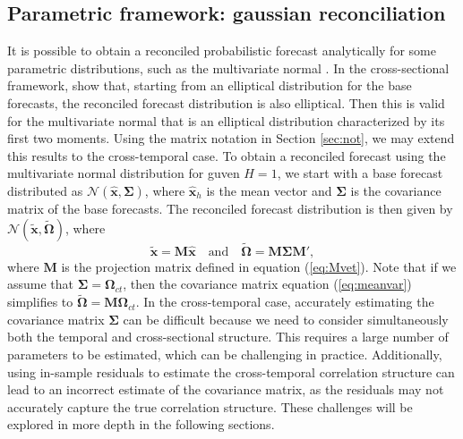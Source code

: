 \documentclass[a4paper,11pt]{article}
\newcommand{\xvet}{\bm{x}}
\newcommand{\Mvet}{\bm{M}}
\newcommand{\Omegavet}{\bm{\Omega}}
\newcommand{\Sigmavet}{\bm{\Sigma}}
\theoremstyle{definition}
\begin{document}
\subsection{Parametric framework: gaussian reconciliation}\label{ssec:prob_pf}
It is possible to obtain a reconciled probabilistic forecast analytically for some parametric distributions, such as the multivariate normal \citep{panagiotelis2023, wickramasuriya2021b, corani2021, eckert2021}. In the cross-sectional framework, \cite{panagiotelis2023} show that, starting from an elliptical distribution for the base forecasts, the reconciled forecast distribution is also elliptical. Then this is valid for the multivariate normal that is an elliptical distribution characterized by its first two moments. Using the matrix notation in Section \ref{sec:not}, we may extend this results to the cross-temporal case. 
To obtain a reconciled forecast using the multivariate normal distribution for guven  $H = 1$, we start with a base forecast distributed as $\mathcal{N}(\widehat{\xvet}, \Sigmavet)$, where $\widehat{\xvet}_h$ is the mean vector and $\Sigmavet$ is the covariance matrix of the base forecasts. The reconciled forecast distribution is then given by $\mathcal{N}(\widetilde{\xvet}, \widetilde{\Omegavet})$, where
\begin{equation}\label{eq:meanvar}
	\widetilde{\xvet} = \Mvet\widehat{\xvet} \quad \mbox{and} \quad \widetilde{\Omegavet} = \Mvet \Sigmavet \Mvet',
\end{equation}
where $\Mvet$ is the projection matrix defined in equation (\ref{eq:Mvet}).
Note that if we assume that $\Sigmavet = \Omegavet_{ct}$, then the covariance matrix equation (\ref{eq:meanvar}) simplifies to $\widetilde{\Omegavet} = \Mvet \Omegavet_{ct}$.
In the cross-temporal case, accurately estimating the covariance matrix $\Sigmavet$ can be difficult because we need to consider simultaneously both the temporal and cross-sectional structure. This requires a large number of parameters to be estimated, which can be challenging in practice. Additionally, using in-sample residuals to estimate the cross-temporal correlation structure can lead to an incorrect estimate of the covariance matrix, as the residuals may not accurately capture the true correlation structure. These challenges will be explored in more depth in the following sections.
\end{document}

